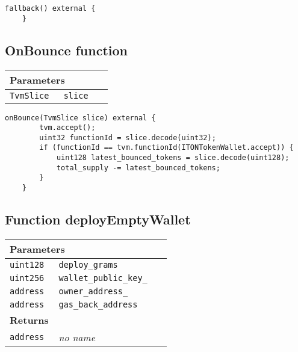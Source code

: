 \vspace{2cm}

\begin{lstlisting}[firstnumber=523]
    fallback() external {
    }
\end{lstlisting}

\subsection{OnBounce function}


\ifsoltables
\noindent\begin{tabular}{|l|l|p{5cm}|}\hline
\multicolumn{3}{|l|}{\bf Parameters}\\\hline
\tt TvmSlice & \tt slice &\\\hline
\end{tabular}
\fi

\vspace{2cm}

\begin{lstlisting}[firstnumber=514]
    onBounce(TvmSlice slice) external {
        tvm.accept();
        uint32 functionId = slice.decode(uint32);
        if (functionId == tvm.functionId(ITONTokenWallet.accept)) {
            uint128 latest_bounced_tokens = slice.decode(uint128);
            total_supply -= latest_bounced_tokens;
        }
    }
\end{lstlisting}

\subsection{Function deployEmptyWallet}


\ifsoltables
\noindent\begin{tabular}{|l|l|p{5cm}|}\hline
\multicolumn{3}{|l|}{\bf Parameters}\\\hline
\tt uint128 & \tt deploy\_{}grams &\\\hline
\tt uint256 & \tt wallet\_{}public\_{}key\_{} &\\\hline
\tt address & \tt owner\_{}address\_{} &\\\hline
\tt address & \tt gas\_{}back\_{}address &\\\hline
\multicolumn{3}{|l|}{\bf Returns}\\\hline
\tt address & {\em no name} &\\\hline
\end{tabular}
\fi

\vspace{2cm}

